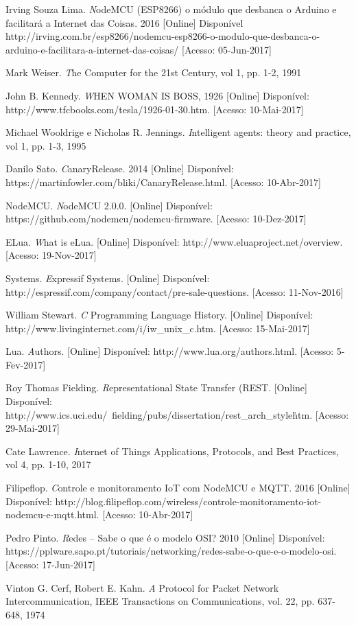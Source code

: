 \documentclass[journal]{IEEEtran}
\begin{document}
\begin{thebibliography}{1}
Irving Souza Lima. \emph NodeMCU (ESP8266) o módulo que desbanca o Arduino e facilitará a Internet das Coisas. 2016 [Online] Disponível
http://irving.com.br/esp8266/nodemcu-esp8266-o-modulo-que-desbanca-o-arduino-e-facilitara-a-internet-das-coisas/ [Acesso: 05-Jun-2017]

Mark Weiser. \emph The Computer for the 21st Century, vol 1, pp. 1-2, 1991

John B. Kennedy. \emph WHEN WOMAN IS BOSS, 1926 [Online] Disponível: http://www.tfcbooks.com/tesla/1926-01-30.htm. [Acesso: 10-Mai-2017]

Michael Wooldrige e Nicholas R. Jennings. \emph Intelligent agents: theory and practice, vol 1, pp. 1-3, 1995

Danilo Sato. \emph CanaryRelease. 2014 [Online] Disponível: https://martinfowler.com/bliki/CanaryRelease.html. [Acesso: 10-Abr-2017]

NodeMCU. \emph NodeMCU 2.0.0. [Online] Disponível: https://github.com/nodemcu/nodemcu-firmware. [Acesso: 10-Dez-2017]

ELua. \emph What is eLua. [Online] Disponível: http://www.eluaproject.net/overview. [Acesso: 19-Nov-2017]

Systems. \emph Expressif Systems. [Online] Disponível: http://espressif.com/company/contact/pre-sale-questions. [Acesso: 11-Nov-2016]

William Stewart. \emph C Programming Language History. [Online] Disponível: http://www.livinginternet.com/i/iw\_unix\_c.htm. [Acesso: 15-Mai-2017]

Lua. \emph Authors. [Online] Disponível: http://www.lua.org/authors.html. [Acesso: 5-Fev-2017]

Roy Thomas Fielding. \emph Representational State Transfer (REST. [Online] Disponível: http://www.ics.uci.edu/~fielding/pubs/dissertation/rest\_arch\_style\.htm. [Acesso: 29-Mai-2017]

Cate Lawrence. \emph Internet of Things Applications, Protocols, and Best Practices, vol 4, pp. 1-10, 2017

Filipeflop. \emph Controle e monitoramento IoT com NodeMCU e MQTT. 2016 [Online] Disponível: http://blog.filipeflop.com/wireless/controle-monitoramento-iot-nodemcu-e-mqtt.html. [Acesso: 10-Abr-2017]

Pedro Pinto. \emph Redes – Sabe o que é o modelo OSI? 2010 [Online] Disponível:
https://pplware.sapo.pt/tutoriais/networking/redes-sabe-o-que-e-o-modelo-osi. [Acesso: 17-Jun-2017]

Vinton G. Cerf, Robert E. Kahn. \emph A Protocol for Packet Network Intercommunication, IEEE Transactions on Communications, vol. 22, pp. 637-648, 1974

\end{thebibliography}
\end{document}
